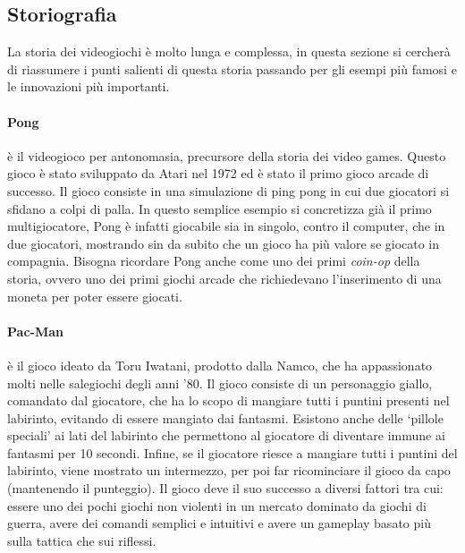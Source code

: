     \subsection{Storiografia}\label{subsec:VideogiochiStoriografia}
        La storia dei videogiochi è molto lunga e complessa, in questa sezione si cercherà di riassumere i punti salienti di questa storia passando per gli esempi più famosi e le
        innovazioni più importanti.

        \paragraph{Pong} è il videogioco per antonomasia, precursore della storia dei video games. Questo gioco è stato sviluppato da Atari nel 1972 ed è stato il primo gioco arcade
            di successo. Il gioco consiste in una simulazione di ping pong in cui due giocatori si sfidano a colpi di palla. In questo semplice esempio si concretizza già il primo 
            multigiocatore, Pong è infatti giocabile sia in singolo, contro il computer, che in due giocatori, mostrando sin da subito che un gioco ha più valore se giocato in compagnia. 
            Bisogna ricordare Pong anche come uno dei primi \textit{coin-op} della storia, ovvero uno dei primi giochi arcade che richiedevano l'inserimento di una moneta per poter 
            essere giocati.

        \paragraph{Pac-Man} è il gioco ideato da Toru Iwatani, prodotto dalla Namco, che ha appassionato molti nelle salegiochi degli anni '80. Il gioco consiste di un personaggio giallo,
            comandato dal giocatore, che ha lo scopo di mangiare tutti i puntini presenti nel labirinto, evitando di essere mangiato dai fantasmi. Esistono anche delle `pillole speciali'
            ai lati del labirinto che permettono al giocatore di diventare immune ai fantasmi per 10 secondi. Infine, se il giocatore riesce a mangiare tutti i puntini del labirinto,
            viene mostrato un intermezzo, per poi far ricominciare il gioco da capo (mantenendo il punteggio). Il gioco deve il suo successo a diversi fattori tra cui: 
            essere uno dei pochi giochi non violenti in un mercato dominato da giochi di guerra, avere dei comandi semplici e intuitivi e avere un gameplay basato più sulla tattica 
            che sui riflessi\cite{Uston1982}.

